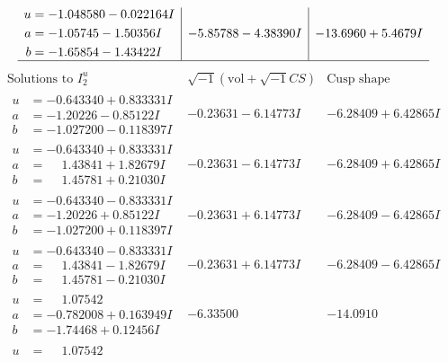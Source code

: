 \documentclass[1p]{elsarticle_modified}
\theoremstyle{definition}
\newcommand{\I}{\sqrt{-1}}
\begin{document}
$$\begin{array}{c|c|c}
\begin{aligned}
u &= -1.048580 - 0.022164 I \\
a &= -1.05745 - 1.50356 I \\
b &= -1.65854 - 1.43422 I\end{aligned}
 & -5.85788 - 4.38390 I & -13.6960 + 5.4679 I\\
 \hline 
 \end{array}$$\newpage$$\begin{array}{c|c|c}  
\text{Solutions to }I^u_{2}& \I (\text{vol} + \sqrt{-1}CS) & \text{Cusp shape}\\
 \hline 
\begin{aligned}
u &= -0.643340 + 0.833331 I \\
a &= -1.20226 - 0.85122 I \\
b &= -1.027200 - 0.118397 I\end{aligned}
 & -0.23631 - 6.14773 I & -6.28409 + 6.42865 I \\ \hline\begin{aligned}
u &= -0.643340 + 0.833331 I \\
a &= \phantom{-}1.43841 + 1.82679 I \\
b &= \phantom{-}1.45781 + 0.21030 I\end{aligned}
 & -0.23631 - 6.14773 I & -6.28409 + 6.42865 I \\ \hline\begin{aligned}
u &= -0.643340 - 0.833331 I \\
a &= -1.20226 + 0.85122 I \\
b &= -1.027200 + 0.118397 I\end{aligned}
 & -0.23631 + 6.14773 I & -6.28409 - 6.42865 I \\ \hline\begin{aligned}
u &= -0.643340 - 0.833331 I \\
a &= \phantom{-}1.43841 - 1.82679 I \\
b &= \phantom{-}1.45781 - 0.21030 I\end{aligned}
 & -0.23631 + 6.14773 I & -6.28409 - 6.42865 I \\ \hline\begin{aligned}
u &= \phantom{-}1.07542\phantom{ +0.000000I} \\
a &= -0.782008 + 0.163949 I \\
b &= -1.74468 + 0.12456 I\end{aligned}
 & -6.33500\phantom{ +0.000000I} & -14.0910\phantom{ +0.000000I} \\ \hline\begin{aligned}
u &= \phantom{-}1.07542\phantom{ +0.000000I} \\

\end{aligned}
\end{array}$$
\end{document}

